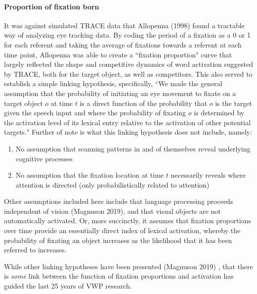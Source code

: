 \documentclass{article}
\begin{document}
\paragraph{Proportion of fixation born} It was against simulated TRACE data that Allopenna (1998) found a tractable way of analyzing eye tracking data. By coding the period of a fixation as a 0 or 1 for each referent and taking the average of fixations towards a referent at each time point, Allopenna was able to create a ``fixation proportion" curve that largely reflected the shape and competitive dynamics of word activation suggested by TRACE, both for the target object, as well as competitors. This also served to establish a simple linking hypothesis, specifically, ``We made the general assumption that the probability of initiating an eye movement to fixate on a target object $o$ at time $t$ is a direct function of the probability that $o$ is the target given the speech input and where the probability of fixating $o$ is determined by the activation level of its lexical entry relative to the activation of other potential targets." Further of note is what this linking hypothesis does not include, namely:

\begin{singlespace}
\begin{enumerate}
\vspace{-3mm}
\item No assumption that scanning patterns in and of themselves reveal underlying cognitive processes
\item No assumption that the fixation location at time $t$ necessarily reveals where attention is directed (only probabilistically related to attention)
\end{enumerate}
\end{singlespace}

Other assumptions included here include that language processing proceeds independent of vision (Magnuson 2019), and that visual objects are not automatically activated. Or, more succinctly, it assumes that fixation proportions over time provide an essentially direct index of lexical activation, whereby the probability of fixating an object increases as the likelihood that it has been referred to increases.


While other linking hypotheses have been presented (Magnuson 2019) \cite{Magnuson2019}, that there is \textit{some} link between the function of fixation proportions and activation has guided the last 25 years of VWP research.
\end{document}
